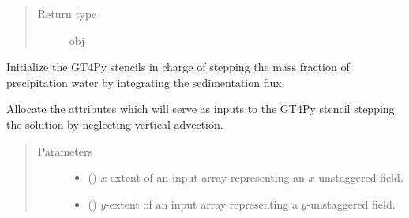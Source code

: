 \documentclass[letterpaper,10pt,english]{sphinxmanual}
\begin{document}
\begin{fulllineitems}
\begin{fulllineitems}
\begin{quote}
\begin{description}
\item[{Return type}] \leavevmode
obj

\end{description}\end{quote}

\end{fulllineitems}


\begin{fulllineitems}
\label{\detokenize{api:tasmania.dycore.prognostic_isentropic_nonconservative_centered.PrognosticIsentropicNonconservativeCentered._stencils_stepping_by_integrating_sedimentation_flux_initialize}}
Initialize the GT4Py stencils in charge of stepping the mass fraction of precipitation water by
integrating the sedimentation flux.

\end{fulllineitems}


\begin{fulllineitems}
\label{\detokenize{api:tasmania.dycore.prognostic_isentropic_nonconservative_centered.PrognosticIsentropicNonconservativeCentered._stencils_stepping_by_neglecting_vertical_advection_allocate_inputs}}
Allocate the attributes which will serve as inputs to the GT4Py stencil stepping the solution
by neglecting vertical advection.
\begin{quote}\begin{description}
\item[{Parameters}] \leavevmode\begin{itemize}
\item {} 
 () \textendash{} \(x\)-extent of an input array representing an \(x\)-unstaggered field.

\item {} 
 () \textendash{} \(y\)-extent of an input array representing a \(y\)-unstaggered field.


\end{itemize}
\end{description}
\end{quote}
\end{fulllineitems}
\end{fulllineitems}
\end{document}
